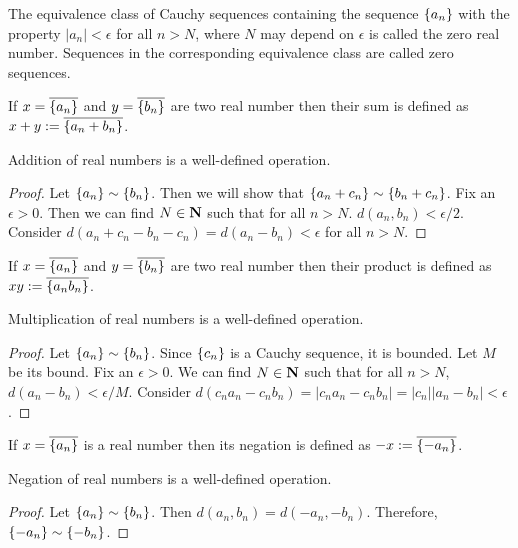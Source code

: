 \begin{defn}\label{c4s3d2}
The equivalence class of Cauchy sequences containing the sequence 
$\{a_n\}$ with the property $|a_n| < \epsilon$ for all $n > N$, where
$N$ may depend on $\epsilon$ is called the zero real number. Sequences
in the corresponding equivalence class are called zero sequences.
\end{defn}

\begin{defn}\label{c4s3d3}
If $x = \overline{\{a_n\}}$ and $y = \overline{\{b_n\}}$ are two
real number then their sum is defined as $x + y := \overline{\{a_n + 
b_n\}}$.
\end{defn}

\begin{lem}\label{c4s3l1}
Addition of real numbers is a well-defined operation.
\end{lem}
\begin{proof}
Let $\{a_n\} \sim \{b_n\}$. Then we will show that $\{a_n + c_n\}
\sim \{b_n + c_n\}$. Fix an $\epsilon > 0$. Then we can find $N \in 
\mathbf{N}$ such that for all $n > N$. $d(a_n, b_n) < \epsilon/2$. Consider
$d(a_n + c_n - b_n - c_n) = d(a_n - b_n) < \epsilon$ for all $n > N$.
\end{proof}

\begin{defn}\label{c4s3d4}
If $x = \overline{\{a_n\}}$ and $y = \overline{\{b_n\}}$ are two
real number then their product is defined as $xy := 
\overline{\{a_nb_n\}}$.
\end{defn}

\begin{lem}\label{c4s3l2}
Multiplication of real numbers is a well-defined operation.
\end{lem}
\begin{proof}
Let $\{a_n\} \sim \{b_n\}$. Since $\{c_n\}$ is a Cauchy sequence, it
is bounded. Let $M$ be its bound. Fix an $\epsilon > 0$. We can find $N 
\in \mathbf{N}$ such that for all $n > N$, $d(a_n - b_n) < \epsilon/M$. Consider 
$d(c_na_n - c_nb_n) = |c_na_n - c_nb_n| = |c_n||a_n - b_n| < \epsilon$.
\end{proof}

\begin{defn}\label{c4s3d5}
If $x = \overline{\{a_n\}}$ is a real number then its negation is 
defined as $-x := \overline{\{-a_n\}}$.
\end{defn}

\begin{lem}\label{c4s3l3}
Negation of real numbers is a well-defined operation.
\end{lem}
\begin{proof}
Let $\{a_n\} \sim \{b_n\}$. Then $d(a_n, b_n) = d(-a_n, -b_n)$. 
Therefore, $\{-a_n\} \sim \{-b_n\}$.
\end{proof}

